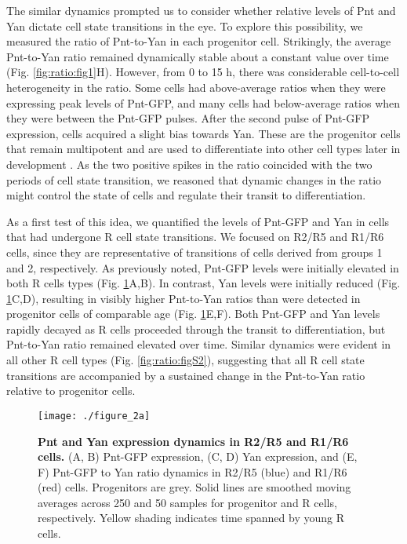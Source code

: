 The similar dynamics prompted us to consider whether relative levels of Pnt and Yan dictate cell state transitions in the eye. To explore this possibility, we measured the ratio of Pnt-to-Yan in each progenitor cell. Strikingly, the average Pnt-to-Yan ratio remained dynamically stable about a constant value over time (Fig. \ref{fig:ratio:fig1}H). However, from 0 to 15 h, there was considerable cell-to-cell heterogeneity in the ratio. Some cells had above-average ratios when they were expressing peak levels of Pnt-GFP, and many cells had below-average ratios when they were between the Pnt-GFP pulses. After the second pulse of Pnt-GFP expression, cells acquired a slight bias towards Yan. These are the progenitor cells that remain multipotent and are used to differentiate into other cell types later in development \cite{Wolff1991}. As the two positive spikes in the ratio coincided with the two periods of cell state transition, we reasoned that dynamic changes in the ratio might control the state of cells and regulate their transit to differentiation.

As a first test of this idea, we quantified the levels of Pnt-GFP and Yan in cells that had undergone R cell state transitions. We focused on R2/R5 and R1/R6 cells, since they are representative of transitions of cells derived from groups 1 and 2, respectively. As previously noted, Pnt-GFP levels were initially elevated in both R cells types (Fig. \ref{fig:ratio:fig2a}A,B). In contrast, Yan levels were initially reduced (Fig. \ref{fig:ratio:fig2a}C,D), resulting in visibly higher Pnt-to-Yan ratios than were detected in progenitor cells of comparable age (Fig. \ref{fig:ratio:fig2a}E,F). Both Pnt-GFP and Yan levels rapidly decayed as R cells proceeded through the transit to differentiation, but Pnt-to-Yan ratio remained elevated over time. Similar dynamics were evident in all other R cell types (Fig. \ref{fig:ratio:figS2}), suggesting that all R cell state transitions are accompanied by a sustained change in the Pnt-to-Yan ratio relative to progenitor cells.

\begin{figure}[h!]
\centering
\vspace{0pt}
\texttt{[image: ./figure\_2a]}
\caption[Pnt and Yan expression dynamics in R2/R5 and R1/R6 cells.]{\textbf{Pnt and Yan expression dynamics in R2/R5 and R1/R6 cells.} (A, B) Pnt-GFP expression, (C, D) Yan expression, and (E, F) Pnt-GFP to Yan ratio dynamics in R2/R5 (blue) and R1/R6 (red) cells. Progenitors are grey. Solid lines are smoothed moving averages across 250 and 50 samples for progenitor and R cells, respectively. Yellow shading indicates time spanned by young R cells.}
\label{fig:ratio:fig2a}
\end{figure}

